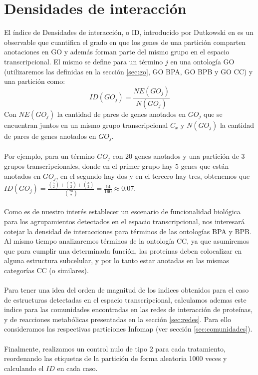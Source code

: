 \section{Densidades de interacción}
El índice de Densidades de interacción, o ID, introducido por Dutkowski en \cite{Dutkowski2013} es un observable que cuantifica el grado en que los genes de una partición comparten anotaciones en GO y además forman parte del mismo grupo en el espacio transcripcional. El mismo se define para un término $j$ en una ontología GO (utilizaremos las definidas en la sección \ref{sec:go}, GO BPA, GO BPB y GO CC) y una partición como:
\begin{equation}
	ID(GO_j) = \frac{NE(GO_j)}{N(GO_j)}
\end{equation}
Con $NE(GO_j)$ la cantidad de pares de genes anotados en $GO_j$ que se encuentran juntos en un mismo grupo transcripcional $C_x$ y $N(GO_j)$ la cantidad de pares de genes anotados en $GO_j$.\\\\
Por ejemplo, para un término $GO_j$ con 20 genes anotados y una partición de 3 grupos transcripcionales, donde en el primer grupo hay 5 genes que están anotados en $GO_j$, en el segundo hay dos y en el tercero hay tres, obtenemos que $ID(GO_j) = \frac{\binom{5}{2}+\binom{2}{2}+\binom{3}{2}}{\binom{20}{2}}=\frac{14}{190}\approx 0.07$.\\\\
Como es de nuestro interés establecer un escenario de funcionalidad biológica para los agrupamientos detectados en el espacio transcripcional, nos interesará cotejar la densidad de interacciones para términos de las ontologías BPA y BPB. Al mismo tiempo analizaremos términos de la ontología CC, ya que asumiremos que para cumplir una determinada función, las proteínas deben colocalizar en alguna estructura subcelular, y por lo tanto estar anotadas en las mismas categorías CC (o similares).\\\\
Para tener una idea del orden de magnitud de los indices obtenidos para el caso de estructuras detectadas en el espacio transcripcional, calculamos ademas este indice para las comunidades encontradas en las redes de interacción de proteínas, y de reacciones metabólicas presentadas en la sección \ref{sec:redes}. Para ello consideramos las respectivas particiones Infomap (ver sección \ref{sec:comunidades}).\\\\
Finalmente, realizamos un control nulo de tipo 2 para cada tratamiento, reordenando las etiquetas de la partición de forma aleatoria 1000 veces y calculando el $ID$ en cada caso.\\\\

